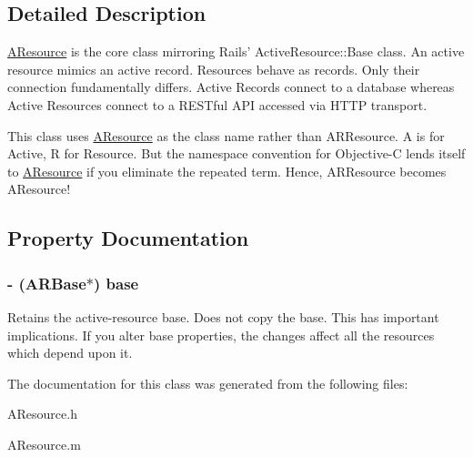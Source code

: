 \subsection{\-Detailed \-Description}
\hyperlink{a00002}{\-A\-Resource} is the core class mirroring \-Rails' \-Active\-Resource\-::\-Base class. \-An active resource mimics an active record. \-Resources behave as records. \-Only their connection fundamentally differs. \-Active \-Records connect to a database whereas \-Active \-Resources connect to a \-R\-E\-S\-Tful \-A\-P\-I accessed via \-H\-T\-T\-P transport.

\-This class uses \hyperlink{a00002}{\-A\-Resource} as the class name rather than \-A\-R\-Resource. \-A is for \-Active, \-R for \-Resource. \-But the namespace convention for \-Objective-\/\-C lends itself to \hyperlink{a00002}{\-A\-Resource} if you eliminate the repeated term. \-Hence, \-A\-R\-Resource becomes \-A\-Resource! 

\subsection{\-Property \-Documentation}
\hypertarget{a00002_a30040e9c47eb757de009e84ef1afb538}{
\subsubsection[{base}]{\setlength{\rightskip}{0pt plus 5cm}-\/ ({\bf \-A\-R\-Base}$\ast$) base}}
\label{a00002_a30040e9c47eb757de009e84ef1afb538}
\-Retains the active-\/resource base. \-Does not copy the base. \-This has important implications. \-If you alter base properties, the changes affect all the resources which depend upon it. 

\-The documentation for this class was generated from the following files\-:\begin{DoxyCompactItemize}
\item 
\-A\-Resource.\-h\item 
\-A\-Resource.\-m\end{DoxyCompactItemize}
